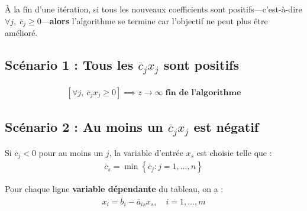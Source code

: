 \documentclass{report}
\begin{document}
\begin{multicols*}{2}
À la fin d'une itération, si tous les  
nouveaux coefficients sont positifs---c'est-à-dire 
$\forall j, \; \overline{c}_j \geq 0$---\textbf{alors} 
l'algorithme se termine car l'objectif
ne peut plus être amélioré.

\subsection{Scénario 1 : Tous les $\overline{c}_j x_j$ sont positifs}
\vspace{-2em}
\begin{align*}
    \left[ \forall j,\ \overline{c}_j x_j \geq 0 \right] \implies
    z \longrightarrow \infty \; 
    \textbf{fin de l'algorithme}
\end{align*}

\subsection{Scénario 2 : Au moins un $\overline{c}_j x_j$ est négatif}

Si $\overline{c}_j < 0$ pour au moins un $j$, la variable d'entrée $x_s$ est choisie telle que :
\begin{align*}
    \overline{c}_s = \min\left\{ \overline{c}_j : j = 1, \dots, n \right\}
\end{align*}

Pour chaque ligne \textbf{variable dépendante} du tableau, on a :
\begin{align*}
    x_i = \overline{b}_i - \overline{a}_{is} x_s,\quad i = 1, \dots, m
\end{align*}


\end{multicols*}
\end{document}
